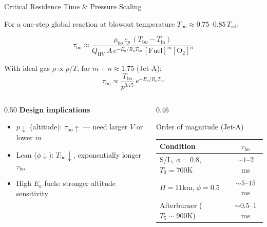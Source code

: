 \documentclass[12pt,aspectratio=169]{beamer}
\newcommand{\taures}{\tau}
\newcommand{\Vr}{V}
\newcommand{\Tad}{T_{\text{ad}}}
\newcommand{\Tin}{T_{\text{in}}}
\newcommand{\mdot}{\dot{m}}
\begin{document}
\begin{frame}{Critical Residence Time \& Pressure Scaling}

  For a one-step global reaction at blowout temperature
  $T_{\text{bo}} \approx 0.75$--$0.85\,\Tad$:

  \[
    \taures_{\text{bo}}
    \approx \frac{\rho_{\text{bo}}\,c_p\,(T_{\text{bo}}-\Tin)}
    {Q_{\text{HV}}\,A\,e^{-E_a/R_u T_{\text{bo}}}
     \,[\text{Fuel}]^m[\text{O}_2]^n}
  \]

  With ideal gas $\rho \propto p/T$, for $m+n \approx 1.75$ (Jet-A):
  \[
    \boxed{
      \taures_{\text{bo}} \propto \frac{T_{\text{bo}}}{p^{0.75}}\,
      e^{+E_a/R_u T_{\text{bo}}}
    }
  \]

  \begin{columns}[t]
    \begin{column}{0.50\textwidth}
      \textbf{Design implications}
      \begin{itemize}
        \item $p \downarrow$ (altitude): $\taures_{\text{bo}} \uparrow$
              --- need larger $\Vr$ or lower $\mdot$
        \item Lean ($\phi \downarrow$): $T_{\text{bo}} \downarrow$,
              exponentially longer $\taures_{\text{bo}}$
        \item High $E_a$ fuels: stronger altitude sensitivity
      \end{itemize}
    \end{column}
    \begin{column}{0.46\textwidth}
      \begin{exampleblock}{Order of magnitude (Jet-A)}
        \begin{tabular}{lc}
          \small Condition & $\taures_{\text{bo}}$ \\
          \midrule
          S/L, $\phi=0.8$, $T_3=700$K & $\sim 1$--$2$ ms \\
          $H=11$km, $\phi=0.5$ & $\sim 5$--$15$ ms \\
          Afterburner ($T_5\sim900$K) & $\sim 0.5$--$1$ ms \\
        \end{tabular}
      \end{exampleblock}
    \end{column}
  \end{columns}
\end{frame}
\end{document}
